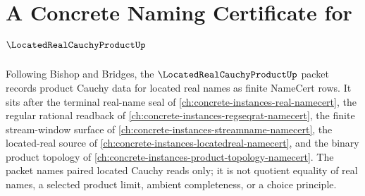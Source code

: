 \chapter{A Concrete Naming Certificate for $\LocatedRealCauchyProductUp$}
\label{ch:concrete-instances-located-real-cauchy-product-namecert}

Following Bishop and Bridges, the $\LocatedRealCauchyProductUp$ packet records product Cauchy data for located real names as finite NameCert rows. It sits after the terminal real-name seal of \autoref{ch:concrete-instances-real-namecert}, the regular rational readback of \autoref{ch:concrete-instances-regseqrat-namecert}, the finite stream-window surface of \autoref{ch:concrete-instances-streamname-namecert}, the located-real source of \autoref{ch:concrete-instances-locatedreal-namecert}, and the binary product topology of \autoref{ch:concrete-instances-product-topology-namecert}. The packet names paired located Cauchy reads only; it is not quotient equality of real names, a selected product limit, ambient completeness, or a choice principle.

